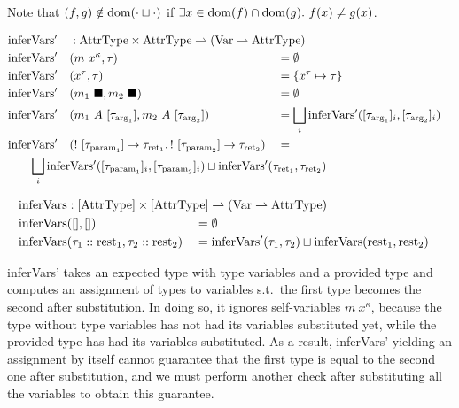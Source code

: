 Note that $(f, g) \notin \mathrm{dom}(\cdot \sqcup \cdot)$ if $\exists x \in \mathrm{dom}(f) \cap \mathrm{dom}(g).\ f(x) \neq g(x)$.

\newcommand{\inferVarsDash}{\mathrm{inferVars'}}

\begin{alignat*}{3}
	&\inferVarsDash &&: \mathrlap{\AttrType \times \AttrType \rightharpoonup (\Var \rightharpoonup \AttrType)} \\
	&\inferVarsDash&&(m\ x^\kappa, \tau) &&= \emptyset \\
	&\inferVarsDash&&(x^\tau, \tau) &&= \{ x^\tau \mapsto \tau \} \\
	&\inferVarsDash&&(m_1\ \blacksquare, m_2\ \blacksquare) &&= \emptyset \\
	&\inferVarsDash&&(m_1\ A\ [\tau_{\arrg_1}], m_2\ A\ [\tau_{\arrg_2}]) &&= \bigsqcup_i \inferVarsDash([\tau_{\arrg_1}]_i, [\tau_{\arrg_2}]_i) \\
	&\inferVarsDash&&(!\ [\tau_{\param_1}] \to \tau_{\ret_1}, !\ [\tau_{\param_2}] \to \tau_{\ret_2}) &&= \\
	&\rebreak{\bigsqcup_i \inferVarsDash([\tau_{\param_1}]_i, [\tau_{\param_2}]_i) \sqcup \inferVarsDash(\tau_{\ret_1}, \tau_{\ret_2})}
\end{alignat*}

\newcommand{\inferVars}{\mathrm{inferVars}}

\begin{alignat*}{3}
	\inferVars &: \mathrlap{[\AttrType] \times [\AttrType] \rightharpoonup (\Var \rightharpoonup \AttrType)} \\
	\inferVars&([], []) &&= \emptyset \\
	\inferVars&(\tau_1 :: \rest_1, \tau_2 :: \rest_2) &&= \inferVarsDash(\tau_1, \tau_2) \sqcup \inferVars(\rest_1, \rest_2) \\
\end{alignat*}

inferVars' takes an expected type with type variables and a provided type and computes an assignment of types to variables s.t.\ the first type becomes the second after substitution. In doing so, it ignores self-variables $m\ x^\kappa$, because the type without type variables has not had its variables substituted yet, while the provided type has had its variables substituted. As a result, inferVars' yielding an assignment by itself cannot guarantee that the first type is equal to the second one after substitution, and we must perform another check after substituting all the variables to obtain this guarantee. 


